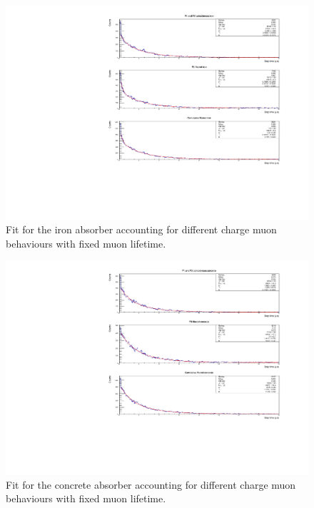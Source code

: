 \documentclass[../main.tex]{subfiles}
\begin{document}
\FloatBarrier
\begin{figure}[htb!]
    \centering
    \includegraphics[width=0.9 \linewidth]{images/fixed_lifetime_fit_iron.pdf}
    \caption{Fit for the iron absorber accounting for different charge muon behaviours with fixed muon lifetime.}
    \label{fig:fixedIron}
\end{figure}

\begin{figure}[htb!]
    \centering
    \includegraphics[width=0.9 \linewidth]{images/fixed_lifetime_fit_concrete.pdf}
    \caption{Fit for the concrete absorber accounting for different charge muon behaviours with fixed muon lifetime.}
    \label{fig:fixedConcrete}
\end{figure}
\FloatBarrier
\end{document}
